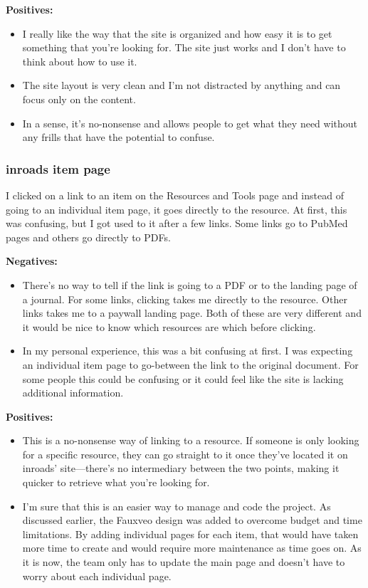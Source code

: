 \documentclass{article}
\begin{document}
\noindent\textbf{Positives:}
\begin{itemize}
\itemsep0em 
    \item I really like the way that the site is organized and how easy it is to get something that you're looking for. The site just works and I don't have to think about how to use it.
    \item The site layout is very clean and I'm not distracted by anything and can focus only on the content.
    \item In a sense, it's no-nonsense and allows people to get what they need without any frills that have the potential to confuse.
\end{itemize}

\subsubsection{inroads item page}
I clicked on a link to an item on the Resources and Tools page and instead of going to an individual item page, it goes directly to the resource. At first, this was confusing, but I got used to it after a few links. Some links go to PubMed pages and others go directly to PDFs.

\noindent\textbf{Negatives:}
\begin{itemize}
\itemsep0em 
    \item There's no way to tell if the link is going to a PDF or to the landing page of a journal. For some links, clicking takes me directly to the resource. Other links takes me to a paywall landing page. Both of these are very different and it would be nice to know which resources are which before clicking.
    \item In my personal experience, this was a bit confusing at first. I was expecting an individual item page to go-between the link to the original document. For some people this could be confusing or it could feel like the site is lacking additional information.
\end{itemize}

\noindent\textbf{Positives:}
\begin{itemize}
\itemsep0em 
    \item This is a no-nonsense way of linking to a resource. If someone is only looking for a specific resource, they can go straight to it once they've located it on inroads' site---there's no intermediary between the two points, making it quicker to retrieve what you're looking for.
    \item I'm sure that this is an easier way to manage and code the project. As discussed earlier, the Fauxveo design was added to overcome budget and time limitations. By adding individual pages for each item, that would have taken more time to create and would require more maintenance as time goes on. As it is now, the team only has to update the main page and doesn't have to worry about each individual page.
\end{itemize}
\end{document}
